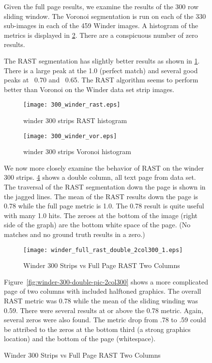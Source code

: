 \documentclass[conference]{IEEEtran}
\begin{document}
\begin{figure}[table-weights]
Given the full page results, we examine the results of the 300 row sliding
window. The Voronoi segmentation is run on each of the 330 sub-images in each of
the 459 Winder images. A histogram of the metrics is displayed in
\ref{fig:300-winder-vor}. There are a conspicuous number of zero results. 

The RAST segmentation has slightly better results as shown in
\ref{fig:300-winder-rast}. There is a large peak at the 1.0 (perfect match) and
several good peaks at ~0.70 and ~0.65. The RAST algorithm seems to perform
better than Voronoi on the Winder data set strip images. 

\begin{figure}[300-winder-rast]
\texttt{[image: 300\_winder\_rast.eps]}
\caption{winder 300 strips RAST histogram}
\label{fig:300-winder-rast}
\end{figure}
\begin{figure}[300-winder-vor]
\texttt{[image: 300\_winder\_vor.eps]}
\caption{winder 300 strips Voronoi histogram}
\label{fig:300-winder-vor}
\end{figure}

We now more closely examine the behavior of RAST on the winder 300 strips.
\ref{fig:winder-300-double-2col300} shows a double column, all
text page from \cite{IEEEhowto:Winder} data set. The traversal of the RAST
segmentation down the page is shown in the jagged lines. The mean of the RAST
results down the page is 0.78 while the full page metric is 1.0.  The 0.78
result is quite useful with many 1.0 hits. The zeroes at the bottom of the
image (right side of the graph) are the bottom white space of the page. (No
matches and no ground truth results in a zero.)

\begin{figure}[winder-300-double-2col300]
\texttt{[image: winder\_full\_rast\_double\_2col300\_1.eps]}
\caption{Winder 300 Strips vs Full Page RAST Two Columns}
\label{fig:winder-300-double-2col300}
\end{figure}

Figure~\ref{fig:winder-300-double-pic-2col300} shows a more complicated page of
two columns with included halftoned graphics. The overall RAST metric was 0.78
while the mean of the sliding winding was 0.59. There were several results at
or above the 0.78 metric. Again, several zeros were also found. The metric drop
from .78 to .59 could be attribed to the zeros at the bottom third (a strong
graphics location) and the bottom of the page (whitespace).


\end{figure}
\end{document}
